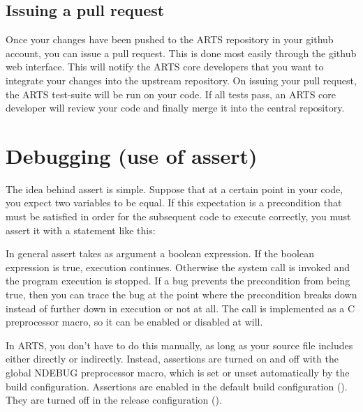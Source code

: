 \subsection{Issuing a pull request}

Once your changes have been pushed to the ARTS repository in your github
account, you can issue a pull request. This is done most easily through the
github web interface. This will notify the ARTS core developers that you want to
integrate your changes into the upstream repository. On issuing your pull
request, the ARTS test-suite will be run on your code. If all tests pass, an
ARTS core developer will review your code and finally merge it into the central
repository.

\section{Debugging (use of assert)}
\label{sec:development:assert}
 
The idea behind assert is simple. Suppose that at a certain point in
your code, you expect two variables to be equal.  If this expectation
is a precondition that must be satisfied in order for the subsequent
code to execute correctly, you must assert it with a statement like
this:
\begin{quote}
\end{quote}

In general assert takes as argument a boolean expression. If the
boolean expression is true, execution continues. Otherwise the
 system call is invoked and the program execution is
stopped. If a bug prevents the precondition from being true, then you
can trace the bug at the point where the precondition breaks down
instead of further down in execution or not at all.  The  call
is implemented as a C preprocessor macro, so it can be enabled or
disabled at will. 

In ARTS, you don't have to do this manually, as long as your source file
includes  either directly or indirectly. Instead, assertions
are turned on and off with the global NDEBUG preprocessor macro, which is
set or unset automatically by the  build configuration.
Assertions are enabled in the default  build configuration
(). They are turned off in the
release configuration ().

